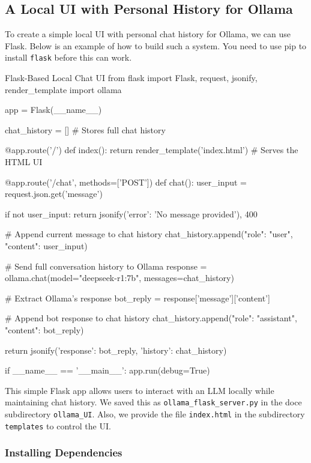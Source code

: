 %   
\subsection{A Local UI with Personal History for Ollama}
To create a simple local UI with personal chat history for Ollama, we can use Flask. Below is an example of how to build such a system. You need to use pip to install \texttt{flask} before this can work. 

\begin{codeonly}{Flask-Based Local Chat UI}
from flask import Flask, request, jsonify, render_template
import ollama

app = Flask(__name__)

chat_history = []  # Stores full chat history

@app.route('/')
def index():
    return render_template('index.html')  # Serves the HTML UI

@app.route('/chat', methods=['POST'])
def chat():
    user_input = request.json.get('message')

    if not user_input:
        return jsonify({'error': 'No message provided'}), 400

    # Append current message to chat history
    chat_history.append({"role": "user", "content": user_input})

    # Send full conversation history to Ollama
    response = ollama.chat(model="deepseek-r1:7b", messages=chat_history)

    # Extract Ollama's response
    bot_reply = response['message']['content']

    # Append bot response to chat history
    chat_history.append({"role": "assistant", "content": bot_reply})

    return jsonify({'response': bot_reply, 'history': chat_history})

if __name__ == '__main__':
    app.run(debug=True)
\end{codeonly}

This simple Flask app allows users to interact with an LLM locally while maintaining chat history.
We saved this as \texttt{ollama\_flask\_server.py} in the doce subdirectory \texttt{ollama\_UI}. Also, we provide the file \texttt{index.html} in the subdirectory \texttt{templates} to control the UI. 


\subsubsection{Installing Dependencies}


